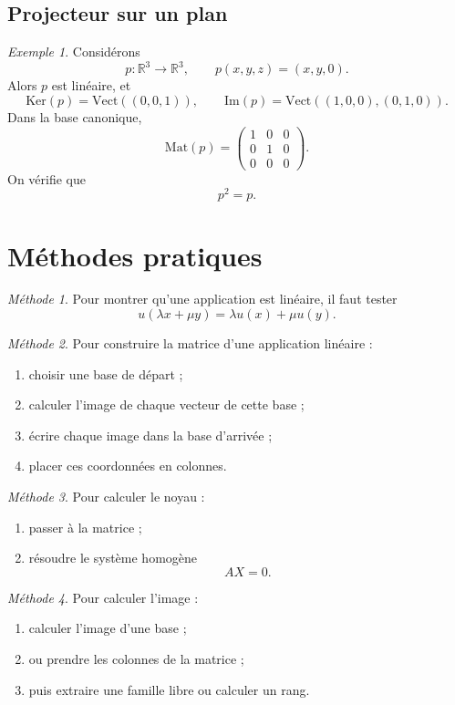 \documentclass[11pt,a4paper]{article}
\theoremstyle{remark}
\newtheorem{exemple}[definition]{Exemple}
\newtheorem*{methode}{Méthode}
\newcommand{\R}{\mathbb{R}}
\newcommand{\Vect}{\mathrm{Vect}}
\newcommand{\Ker}{\mathrm{Ker}}
\newcommand{\Img}{\mathrm{Im}}
\begin{document}
\subsection{Projecteur sur un plan}

\begin{exemple}
Considérons
\[
p:\R^3\to\R^3,\qquad p(x,y,z)=(x,y,0).
\]
Alors \(p\) est linéaire, et
\[
\Ker(p)=\Vect((0,0,1)),
\qquad
\Img(p)=\Vect((1,0,0),(0,1,0)).
\]
Dans la base canonique,
\[
\mathrm{Mat}(p)=
\begin{pmatrix}
1 & 0 & 0\\
0 & 1 & 0\\
0 & 0 & 0
\end{pmatrix}.
\]
On vérifie que
\[
p^2=p.
\]
\end{exemple}

\section{Méthodes pratiques}

\begin{methode}
Pour montrer qu’une application est linéaire, il faut tester
\[
u(\lambda x+\mu y)=\lambda u(x)+\mu u(y).
\]
\end{methode}

\begin{methode}
Pour construire la matrice d’une application linéaire :
\begin{enumerate}
    \item choisir une base de départ ;
    \item calculer l’image de chaque vecteur de cette base ;
    \item écrire chaque image dans la base d’arrivée ;
    \item placer ces coordonnées en colonnes.
\end{enumerate}
\end{methode}

\begin{methode}
Pour calculer le noyau :
\begin{enumerate}
    \item passer à la matrice ;
    \item résoudre le système homogène
    \[
    AX=0.
    \]
\end{enumerate}
\end{methode}

\begin{methode}
Pour calculer l’image :
\begin{enumerate}
    \item calculer l’image d’une base ;
    \item ou prendre les colonnes de la matrice ;
    \item puis extraire une famille libre ou calculer un rang.
\end{enumerate}
\end{methode}
\end{document}
